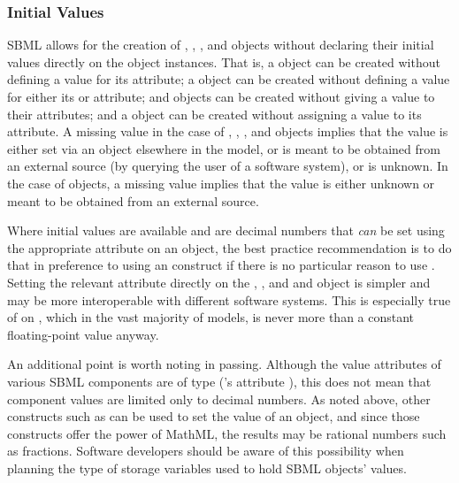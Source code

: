 \subsubsection{Initial Values}
\label{sec:bp:initialvalues}

SBML allows for the creation of \Compartment, \Species,
\Parameter, \LocalParameter and \SpeciesReference objects without
declaring their initial values directly on the object instances.
That is, a \Compartment object can be created without defining a
value for its  attribute; a \Species object can be
created without defining a value for either its
 or  attribute;
\Parameter and \LocalParameter objects can be created without
giving a value to their  attributes; and a
\SpeciesReference object can be created without assigning a value
to its  attribute.  A missing value in the
case of \Compartment, \Species, \Parameter, and \SpeciesReference
objects implies that the value is either set via an
\InitialAssignment object elsewhere in the model, or is meant to
be obtained from an external source (\eg by querying the user of a
software system), or is unknown.  In the case of \LocalParameter
objects, a missing value implies that the value is either unknown
or meant to be obtained from an external source.

Where initial values are available and are decimal numbers that
\emph{can} be set using the appropriate attribute on an object,
the best practice recommendation is to do that in preference to
using an \InitialAssignment construct if there is no particular
reason to use \InitialAssignment.  Setting the relevant attribute
directly on the \Compartment, \Species, and \Parameter and
\SpeciesReference object is simpler and may be more interoperable
with different software systems.  This is especially true of
 on \SpeciesReference, which in the vast
majority of models, is never more than a constant floating-point
value anyway.

An additional point is worth noting in passing.  Although the
value attributes of various SBML components are of type
 (\eg \Parameter's attribute ), this
does not mean that component values are limited only to decimal
numbers.  As noted above, other constructs such as
\InitialAssignment can be used to set the value of an object, and
since those constructs offer the power of MathML, the results may
be rational numbers such as fractions.  Software developers should
be aware of this possibility when planning the type of storage
variables used to hold SBML objects' values.


